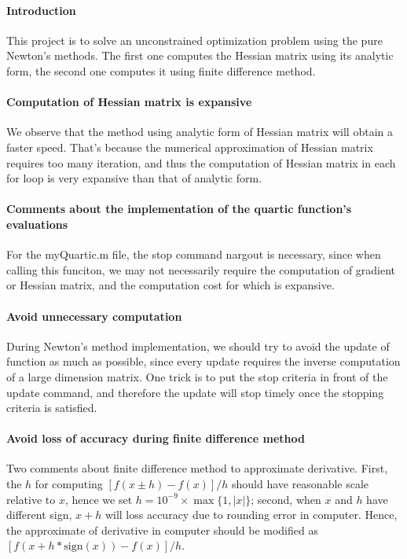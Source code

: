 \paragraph{Introduction}
This project is to solve an unconstrained optimization problem using the pure Newton's methods. The first one computes the Hessian matrix using its analytic form, the second one computes it using finite difference method.
\paragraph{Computation of Hessian matrix is expansive}
We observe that the method using analytic form of Hessian matrix will obtain a faster speed. That's because the numerical approximation of Hessian matrix requires too many iteration, and thus the computation of Hessian matrix in each for loop is very expansive than that of analytic form. 
\paragraph{Comments about the implementation of the quartic function's evaluations}
For the \textrm{myQuartic.m} file, the stop command \textrm{nargout} is necessary, since when calling this funciton, we may not necessarily require the computation of gradient or Hessian matrix, and the computation cost for which is expansive.
\paragraph{Avoid unnecessary computation}
During Newton's method implementation, we should try to avoid the update of function as much as possible, since every update requires the inverse computation of a large dimension matrix. One trick is to put the stop criteria in front of the update command, and therefore the update will stop timely once the stopping criteria is satisfied.
\paragraph{Avoid loss of accuracy during finite difference method}
Two comments about finite difference method to approximate derivative. First, the $h$ for computing $[f(x\pm h)-f(x)]/h$ should have reasonable scale relative to $x$, hence we set $h=10^{-9}\times\max\{1,|x|\}$; second, when $x$ and $h$ have different sign, $x+h$ will loss accuracy due to rounding error in computer. Hence, the approximate of derivative in computer should be modified as $[f(x+ h*\mbox{sign}(x))-f(x)]/h$.
 








